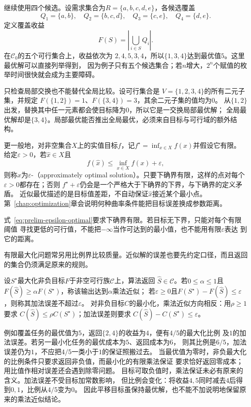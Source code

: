 继续使用四个候选。设需求集合为$R=\{a,b,c,d,e\}$，各候选覆盖
\[
  Q_1=\{a,b\},\quad
  Q_2=\{b,c,d\},\quad
  Q_3=\{c,e\},\quad
  Q_4=\{d,e\}.
\]
定义覆盖收益
\begin{equation}
  F(S)=\left|\bigcup_{i\in S}Q_i\right|.
  \label{eq:comb-running-coverage}
\end{equation}
在$\mathcal{C}_0$的五个可行集合上，收益依次为
$2,4,5,3,4$，所以$\{1,3,4\}$达到最优值$5$。这里最优解可以直接列举得到，
因为例子只有五个候选集合；若$n$增大，$2^n$个赋值的枚举时间很快就会成为主要障碍。

只检查局部交换也不能替代全局比较。设可行集合是
$V=\{1,2,3,4\}$的所有二元子集，并规定
$F(\{1,2\})=1$、$F(\{3,4\})=3$，其余二元子集的值均为$0$。
从$\{1,2\}$出发，替换其中任一元素都会使目标降为$0$，所以它是一交换局部最优解；
全局最优解却是$\{3,4\}$。局部最优能否推出全局最优，必须来自目标与可行域的额外结构。

更一般地，对非空集合$X$上的实值目标$f$，记$f^\star=\inf_{x\in X}f(x)$并假设它有限。
给定$\varepsilon>0$，若$\widehat x\in X$且
\begin{equation}
  f(\widehat{x})\leq \inf_{x\in X}f(x)+\varepsilon,
  \label{eq:prelim-epsilon-optimal}
\end{equation}
则称$\widehat{x}$为$\varepsilon$-（approximately optimal
solution）。只要下确界有限，这样的点对每个$\varepsilon>0$都存在；否则
$f^\star+\varepsilon$仍会是一个严格大于下确界的下界，与下确界的定义矛盾。
近似最优描述的是目标值差距，不自动保证$\widehat{x}$接近某个最小点。第~\ref{chap:optimization}章会说明何种曲率条件能把目标误差换成参数距离。

式~\eqref{eq:prelim-epsilon-optimal}要求下确界有限。若目标无下界，只能对每个有限阈值
寻找更低的可行值，不能把$-\infty$当作可达到的最小值，也不能用有限$\varepsilon$表达
到它的距离。

有限最大化问题常另用比例界比较质量。近似解的误差也要先约定口径，而且返回的集合仍须满足原来的规则。
\begin{definition}[乘法近似与加法误差]
\label{def:comb-approximation-guarantee}
设$S^\star$最大化非负目标$F$于非空可行族$\mathcal C$上，算法返回
$\widehat S\in\mathcal C$。若$0\leq\alpha\leq1$且
$F(\widehat S)\geq\alpha F(S^\star)$，称该输出达到$\alpha$乘法近似；
若$\varepsilon\geq0$且$F(S^\star)-F(\widehat S)\leq\varepsilon$，则称其加法误差不超过$\varepsilon$。
对非负目标$C$的最小化，乘法近似方向相反：用$\rho\geq1$要求
$C(\widehat S)\leq\rho C(S^\star)$；加法误差则要求
$C(\widehat S)-C(S^\star)\leq\varepsilon$。
\end{definition}
例如覆盖任务的最优值为$5$，返回$\{2,4\}$的收益为$4$，便有$4/5$的最大化比例
及$1$的加法误差。若另一最小化任务的最优成本为$5$、返回成本为$6$，
则其比例是$6/5$，加法误差仍为$1$，不应把$4/5$一类小于$1$的保证照搬过去。
当最优值为零时，非负最大化的比例条件只要求返回非负值，而最小化的有限乘法保证
要求恰好返回零成本；用比值作相对误差还会遇到除零问题。
目标可取负值时，乘法保证未必有原来的含义。加法误差不受目标加常数影响，
但比例会变化：将收益$4,5$同时减去$4$后得到$0,1$，比例从$4/5$变为$0$。
因此平移目标虽保持最优解，也不能不加说明地保留原来的乘法近似结论。

